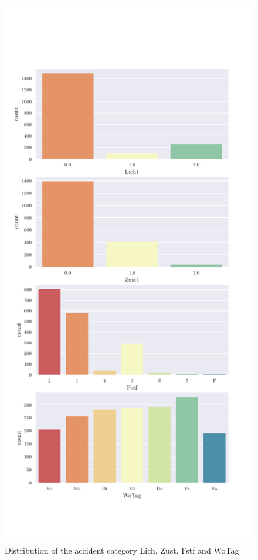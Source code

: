     \begin{figure}[ht!]
        \centering
        \includegraphics[scale=0.7]{code/data/BAYSIS/02_matched/plots/baysis_matched_count_multiple03}
        \caption{Distribution of the accident category Lich, Zust, Fstf and WoTag}
        \label{img:baysis_matched_Lich}
        \label{img:baysis_matched_Zust}
        \label{img:baysis_matched_Fstf}
        \label{img:baysis_matched_WoTag}
    \end{figure}


